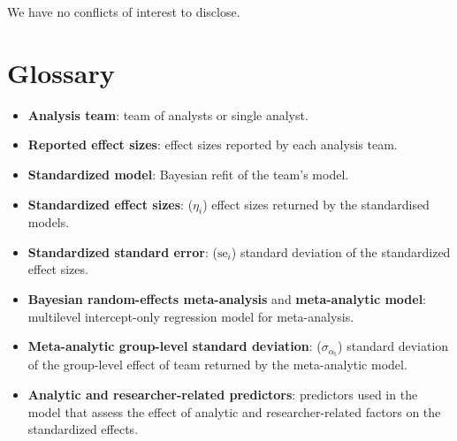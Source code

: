 \documentclass[Review,times,sageh]{sagej}
\providecommand{\tightlist}{\setlength{\itemsep}{0pt}\setlength{\parskip}{0pt}}
\begin{document}
We have no conflicts of interest to disclose.

\appendix

\hypertarget{glossary}{%
\section{Glossary}\label{glossary}}

\begin{itemize}
\tightlist
\item
  \textbf{Analysis team}: team of analysts or single analyst.
\item
  \textbf{Reported effect sizes}: effect sizes reported by each analysis team.
\item
  \textbf{Standardized model}: Bayesian refit of the team's model.
\item
  \textbf{Standardized effect sizes}: (\(\eta_i\)) effect sizes returned by the standardised models.
\item
  \textbf{Standardized standard error}: (\(\text{se}_i\)) standard deviation of the standardized effect sizes.
\item
  \textbf{Bayesian random-effects meta-analysis} and \textbf{meta-analytic model}: multilevel intercept-only regression model for meta-analysis.
\item
  \textbf{Meta-analytic group-level standard deviation}: (\(\sigma_{\alpha_{\text{t}}}\)) standard deviation of the group-level effect of team returned by the meta-analytic model.
\item
  \textbf{Analytic and researcher-related predictors}: predictors used in the model that assess the effect of analytic and researcher-related factors on the standardized effects.
\end{itemize}



\end{document}

